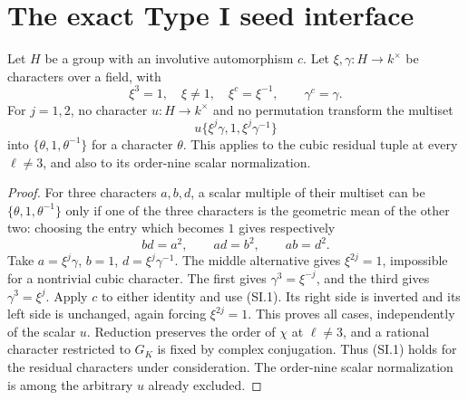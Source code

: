 \section{The exact Type I seed interface}
\label{sec:cubic-typei-seed}

\begin{lemma}
\label{AC-K29-seed-shape}
Let $H$ be a group with an involutive automorphism $c$.
Let $\xi,\gamma:H\to k^\times$ be characters over a field,
with
\[
 \xi^3=1,\quad \xi\ne1,\quad \xi^c=\xi^{-1},
                         \qquad \gamma^c=\gamma.
                                                               \tag{SI.1}
\]
For $j=1,2$, no character $u:H\to k^\times$ and no
permutation transform the multiset
\[
                  u\{\xi^j\gamma,1,\xi^j\gamma^{-1}\}
                                                               \tag{SI.2}
\]
into $\{\theta,1,\theta^{-1}\}$ for a character $\theta$.
This applies to the cubic residual tuple at every
$\ell\ne3$, and also to its order-nine scalar normalization.
\end{lemma}
\begin{proof}
For three characters $a,b,d$, a scalar multiple of their
multiset can be $\{\theta,1,\theta^{-1}\}$ only if one
of the three characters is the geometric mean of the other
two: choosing the entry which becomes $1$ gives respectively
\[
                         bd=a^2,\qquad ad=b^2,
                                  \qquad ab=d^2.              \tag{SI.3}
\]
Take $a=\xi^j\gamma$, $b=1$, $d=\xi^j\gamma^{-1}$.
The middle alternative gives $\xi^{2j}=1$, impossible
for a nontrivial cubic character.  The first gives
$\gamma^3=\xi^{-j}$, and the third gives
$\gamma^3=\xi^j$.  Apply $c$ to either identity and use
(SI.1).  Its right side is inverted and its left side is
unchanged, again forcing $\xi^{2j}=1$.  This proves all
cases, independently of the scalar $u$.
Reduction preserves the order of $\chi$ at $\ell\ne3$,
and a rational character restricted to $G_K$ is fixed by
complex conjugation.  Thus (SI.1) holds for the residual
characters under consideration.  The order-nine scalar
normalization is among the arbitrary $u$ already excluded.
\end{proof}

